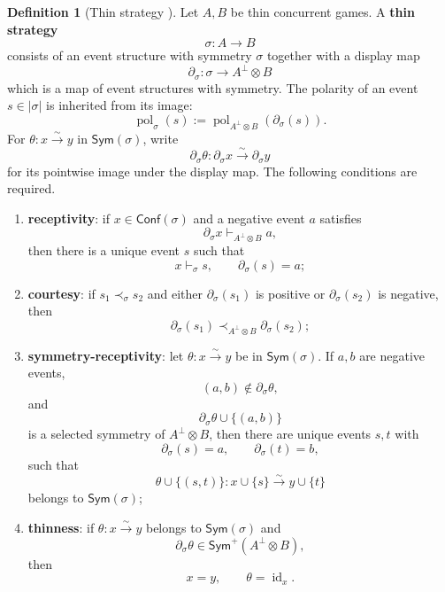 \documentclass[oneside]{article}
\newcommand{\Conf}{\mathsf{Conf}}
\newcommand{\Sym}{\mathsf{Sym}}
\newcommand{\id}{\operatorname{id}}
\theoremstyle{plain}
\theoremstyle{definition}
\newtheorem{definition}[theorem]{Definition}
\theoremstyle{remark}
\begin{document}
\begin{definition}[Thin strategy {\cite[Defs.~4.2 and 5.4]{ClairambaultOlimpieriPaquet2025}}]
\label{def:cgqg-background-thin-strategy}
    Let \(A,B\) be thin concurrent games. A \textbf{thin strategy}
    \[
        \sigma:A\longrightarrow B
    \]
    consists of an event structure with symmetry \(\sigma\) together with a display map
    \[
        \partial_\sigma:
        \sigma\longrightarrow A^\perp\otimes B
    \]
    which is a map of event structures with symmetry. The polarity of an event \(s\in|\sigma|\) is inherited from its image:
    \[
        \operatorname{pol}_\sigma(s)
        :=
        \operatorname{pol}_{A^\perp\otimes B}(\partial_\sigma(s)).
    \]
    For \(\theta:x\xrightarrow{\sim}y\) in \(\Sym(\sigma)\), write
    \[
        \partial_\sigma\theta:
        \partial_\sigma x\xrightarrow{\sim}\partial_\sigma y
    \]
    for its pointwise image under the display map. The following conditions are required.
    \begin{enumerate}
        \item \textbf{receptivity}: if \(x\in\Conf(\sigma)\) and a negative event \(a\) satisfies
        \[
            \partial_\sigma x\vdash_{A^\perp\otimes B} a,
        \]
        then there is a unique event \(s\) such that
        \[
            x\vdash_\sigma s,
            \qquad
            \partial_\sigma(s)=a;
        \]

        \item \textbf{courtesy}: if \(s_1\prec_\sigma s_2\) and either \(\partial_\sigma(s_1)\) is positive or \(\partial_\sigma(s_2)\) is negative, then
        \[
            \partial_\sigma(s_1)
            \prec_{A^\perp\otimes B}
            \partial_\sigma(s_2);
        \]

        \item \textbf{symmetry-receptivity}: let \(\theta:x\xrightarrow{\sim}y\) be in \(\Sym(\sigma)\). If \(a,b\) are negative events,
        \[
            (a,b)\notin\partial_\sigma\theta,
        \]
        and
        \[
            \partial_\sigma\theta\cup\{(a,b)\}
        \]
        is a selected symmetry of \(A^\perp\otimes B\), then there are unique events \(s,t\) with
        \[
            \partial_\sigma(s)=a,
            \qquad
            \partial_\sigma(t)=b,
        \]
        such that
        \[
            \theta\cup\{(s,t)\}:
            x\cup\{s\}\xrightarrow{\sim}y\cup\{t\}
        \]
        belongs to \(\Sym(\sigma)\);

        \item \textbf{thinness}: if \(\theta:x\xrightarrow{\sim}y\) belongs to \(\Sym(\sigma)\) and
        \[
            \partial_\sigma\theta
            \in\Sym^+(A^\perp\otimes B),
        \]
        then
        \[
            x=y,
            \qquad
            \theta=\id_x.
        \]
    \end{enumerate}
\end{definition}
\end{document}
